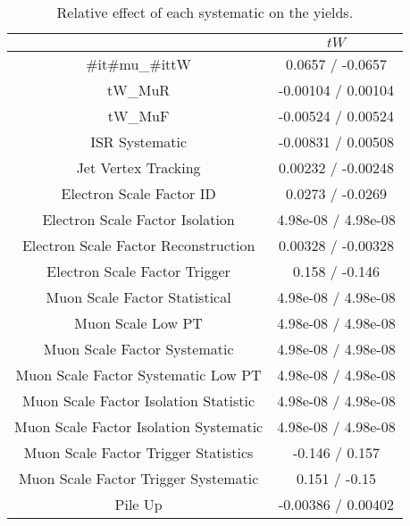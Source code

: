 \documentclass[10pt]{article}
\begin{document}
\begin{table}[htbp]
\begin{center}
\begin{tabular}{|c|c|}
\hline 
      & $tW$ \\ 
\hline 
  #it{#mu}_{#it{tW}} & 0.0657 / -0.0657 \\ 
  tW_MuR & -0.00104 / 0.00104 \\ 
  tW_MuF & -0.00524 / 0.00524 \\ 
  ISR Systematic & -0.00831 / 0.00508 \\ 
  Jet Vertex Tracking & 0.00232 / -0.00248 \\ 
  Electron Scale Factor ID & 0.0273 / -0.0269 \\ 
  Electron Scale Factor Isolation & 4.98e-08 / 4.98e-08 \\ 
  Electron Scale Factor Reconstruction & 0.00328 / -0.00328 \\ 
  Electron Scale Factor Trigger & 0.158 / -0.146 \\ 
  Muon Scale Factor Statistical & 4.98e-08 / 4.98e-08 \\ 
  Muon Scale Low PT & 4.98e-08 / 4.98e-08 \\ 
  Muon Scale Factor Systematic & 4.98e-08 / 4.98e-08 \\ 
  Muon Scale Factor Systematic Low PT & 4.98e-08 / 4.98e-08 \\ 
  Muon Scale Factor Isolation Statistic & 4.98e-08 / 4.98e-08 \\ 
  Muon Scale Factor Isolation Systematic & 4.98e-08 / 4.98e-08 \\ 
  Muon Scale Factor Trigger Statistics & -0.146 / 0.157 \\ 
  Muon Scale Factor Trigger Systematic & 0.151 / -0.15 \\ 
  Pile Up & -0.00386 / 0.00402 \\ 
\hline 
\end{tabular} 
\caption{Relative effect of each systematic on the yields.} 
\end{center} 
\end{table} 
\end{document}
